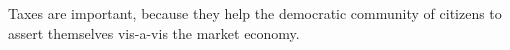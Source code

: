 Taxes are important, because they help the democratic community of citizens to assert themselves vis-a-vis the market economy.